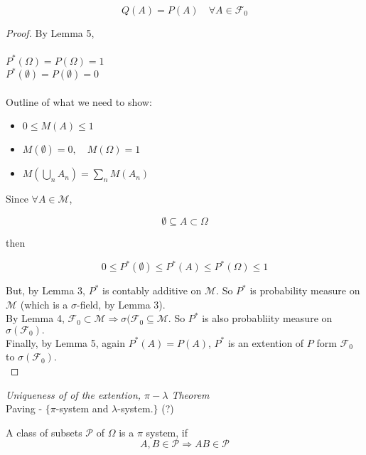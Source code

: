\documentclass[11pt,fleqn]{book} %
\begin{document}
	$$Q(A) =  P(A) \quad \forall A \in \mathcal{F}_0$$

\begin{proof}
	By Lemma 5, \\
\\
	$P^*(\Omega) = P(\Omega) = 1$\\
	$P^*(\emptyset) = P(\emptyset) = 0$\\
	\\

	Outline of what we need to show:\\

	\begin{itemize}
		\item $ 0 \leq M(A) \leq 1$
		\item $M(\emptyset) = 0, \quad M(\Omega)=1$
		\item $M(\bigcup_n A_n) = \sum_n M(A_n)$
	\end{itemize}

	\vspace{5mm}

	Since $\forall A \in \mathcal{M}$, 

	$$\emptyset \subseteq A \subset \Omega $$

	then 

	$$ 0 \leq P^*(\emptyset) \leq P^*(A) \leq P^*(\Omega) \leq 1$$

	But, by Lemma 3, $P^*$ is contably additive on $\mathcal{M}$. So $P^*$ is probability measure on $\mathcal{M}$ (which is a $\sigma$-field, by Lemma 3).\\

	By Lemma 4, $\mathcal{F}_0 \subset \mathcal{M} \Rightarrow \sigma(\mathcal{F}_0 \subseteq \mathcal{M}$. So $P^*$ is also probabliity measure on $\sigma(\mathcal{F}_0).$\\

	Finally, by Lemma 5, again $P^*(A) = P(A)$, $P^*$ is an extention of $P$ form $\mathcal{F}_0$  to $\sigma(\mathcal{F}_0)$. \\
\end{proof}

\textit{Uniqueness of of the extention, $\pi-\lambda$ Theorem}\\

	Paving - $\{ \pi$-system and $\lambda$-system.$\}$ (?)\\

\begin{definition}[$\pi$-System]
	A class of subsets $\mathcal{P}$ of $\Omega$ is a $\pi$ system, if $$A, B \in \mathcal{P} \Rightarrow AB \in \mathcal{P}$$ 
\end{definition}
	
\end{document}
